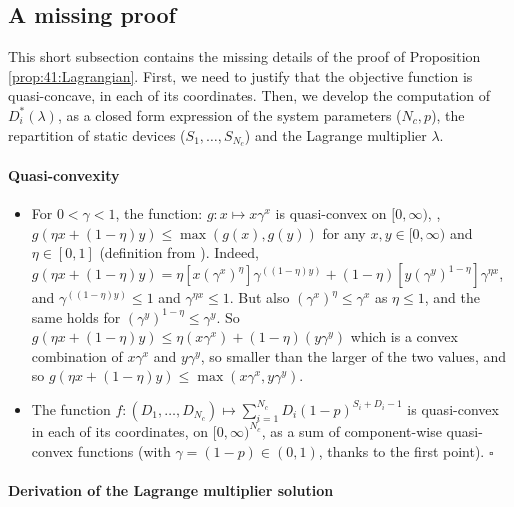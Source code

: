 \subsection{A missing proof}

This short subsection contains the missing details of the proof of Proposition \ref{prop:41:Lagrangian}.
%
First, we need to justify that the objective function is quasi-concave, in each of its coordinates.
%
Then, we develop the computation of $D_i^*(\lambda)$, as a closed form expression of the system parameters ($N_c, p$), the repartition of static devices ($S_1,\dots,S_{N_c}$) and the Lagrange multiplier $\lambda$.

\paragraph{Quasi-convexity}

\begin{itemize}
	\item
	For $0 < \gamma < 1$, the function: $g: x \mapsto x \gamma^x$ is quasi-convex on $[0,\infty)$, \ie, $g(\eta x + (1-\eta)y) \leq \max(g(x), g(y))$ for any $x,y \in [0,\infty)$ and $\eta \in [0,1]$ (definition from \cite{Luenberger68}).
    Indeed, $g(\eta x + (1-\eta)y) = \eta \left[ x (\gamma^x)^{\eta} \right] \gamma^{((1-\eta)y)} + (1-\eta)\left[ y (\gamma^y)^{1-\eta}\right] \gamma^{\eta x}$, and $\gamma^{((1-\eta)y)} \leq 1$ and $\gamma^{\eta x} \leq 1$. But also $(\gamma^x)^{\eta} \leq \gamma^x$ as $\eta \leq 1$, and the same holds for $(\gamma^y)^{1-\eta} \leq \gamma^y$. So $g(\eta x + (1-\eta)y) \leq \eta (x \gamma^x) + (1 - \eta) (y \gamma^y)$ which is a convex combination of $x \gamma^x$ and $y \gamma^y$, so smaller than the larger of the two values, and so $g(\eta x + (1-\eta)y) \leq \max(x \gamma^x, y \gamma^y)$.

    \item
    The function $f: (D_1, \dots, D_{N_c}) \mapsto \sum_{i=1}^{N_c} D_i (1 - p)^{S_i + D_i -1}$ is quasi-convex in each of its coordinates, on $[0,\infty)^{N_c}$, as a sum of component-wise quasi-convex functions (with $\gamma = (1 - p) \in (0, 1)$, thanks to the first point).
    \hfill{}$\square$
\end{itemize}


\paragraph{Derivation of the Lagrange multiplier solution}

